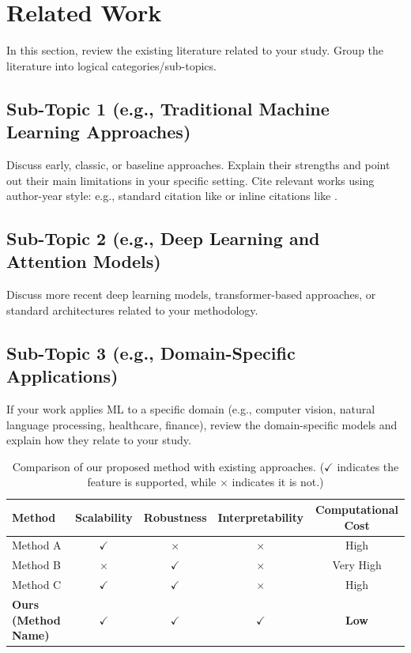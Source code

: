 \section{Related Work}\label{sec:related_work}
In this section, review the existing literature related to your study. Group the literature into logical categories/sub-topics.

\subsection{Sub-Topic 1 (e.g., Traditional Machine Learning Approaches)}
Discuss early, classic, or baseline approaches. Explain their strengths and point out their main limitations in your specific setting. Cite relevant works using author-year style: e.g., standard citation like \citep{lecun2015deep} or inline citations like \citet{vaswani2017attention}.

\subsection{Sub-Topic 2 (e.g., Deep Learning and Attention Models)}
Discuss more recent deep learning models, transformer-based approaches, or standard architectures related to your methodology. 

\subsection{Sub-Topic 3 (e.g., Domain-Specific Applications)}
If your work applies ML to a specific domain (e.g., computer vision, natural language processing, healthcare, finance), review the domain-specific models and explain how they relate to your study.

\begin{table}[h]
\caption{Comparison of our proposed method with existing approaches. ($\checkmark$ indicates the feature is supported, while $\times$ indicates it is not.)}\label{tab:related_work_comparison}
\begin{tabular}{@{}lcccc@{}}
\toprule
Method & Scalability & Robustness & Interpretability & Computational Cost \\
\midrule
Method A \citep{lecun2015deep} & $\checkmark$ & $\times$ & $\times$ & High \\
Method B \citep{vaswani2017attention} & $\times$ & $\checkmark$ & $\times$ & Very High \\
Method C \citep{goodfellow2016deep} & $\checkmark$ & $\checkmark$ & $\times$ & High \\
\textbf{Ours (Method Name)} & \textbf{$\checkmark$} & \textbf{$\checkmark$} & \textbf{$\checkmark$} & \textbf{Low} \\
\bottomrule
\end{tabular}
\end{table}
